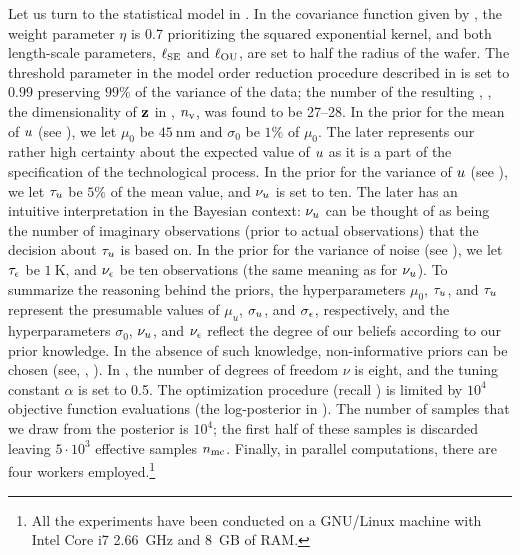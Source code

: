 Let us turn to the statistical model in . In the covariance function given by , the weight parameter $\eta$ is 0.7 prioritizing the squared exponential kernel, and both length-scale parameters, $\ell_{\text{SE}}$ and $\ell_{\text{OU}}$, are set to half the radius of the wafer. The threshold parameter in the model order reduction procedure described in  is set to $0.99$ preserving $99\%$ of the variance of the data; the number of the resulting \rvs, \ie, the dimensionality of $\mathbf{z}$ in , ${n_\text{v}}$, was found to be 27--28.
In the prior for the mean of $u$ (see ), we let $\mu_0$ be $45~\text{nm}$ and $\sigma_0$ be $1\%$ of $\mu_0$. The later represents our rather high certainty about the expected value of $u$ as it is a part of the specification of the technological process.
In the prior for the variance of $u$ (see ), we let $\tau_u$ be $5\%$ of the mean value, and $\nu_u$ is set to ten. The later has an intuitive interpretation in the Bayesian context: $\nu_u$ can be thought of as being the number of imaginary observations (prior to actual observations) that the decision about $\tau_u$ is based on.
In the prior for the variance of noise (see ), we let $\tau_\epsilon$ be $1~\text{K}$, and $\nu_\epsilon$ be ten observations (the same meaning as for $\nu_u$).
To summarize the reasoning behind the priors, the hyperparameters $\mu_0$, $\tau_u$, and $\tau_u$ represent the presumable values of $\mu_u$, $\sigma_u$, and $\sigma_\epsilon$, respectively, and the hyperparameters $\sigma_0$, $\nu_u$, and $\nu_\epsilon$ reflect the degree of our beliefs according to our prior knowledge. In the absence of such knowledge, non-informative priors can be chosen (see, \eg, \cite{gelman2004}).
In , the number of degrees of freedom $\nu$ is eight, and the tuning constant $\alpha$ is set to 0.5.
The optimization procedure (recall ) is limited by $10^4$ objective function evaluations (the log-posterior in ).
The number of samples that we draw from the posterior is $10^4$; the first half of these samples is discarded leaving $5 \cdot 10^3$ effective samples ${n_\text{mc}}$.
Finally, in parallel computations, there are four workers employed.\footnote{All the experiments have been conducted on a GNU/Linux machine with Intel Core i7 2.66~GHz and 8~GB of RAM.}

